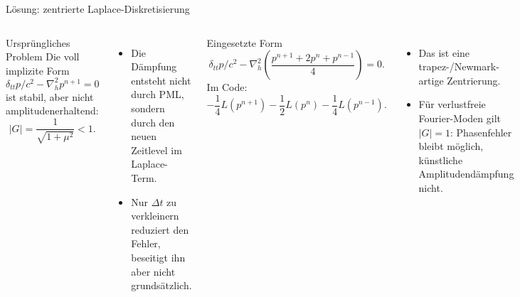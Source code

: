 \documentclass[
	german,%
	accentcolor=9c,%
	accept-missing-logos=true,%
]{tudabeamer}
\begin{document}
\begin{frame}{Lösung: zentrierte Laplace-Diskretisierung}
    \scriptsize
    \setlength{\abovedisplayskip}{0.04cm}
    \setlength{\belowdisplayskip}{0.04cm}
    \begin{columns}[T]
    \begin{block}{Ursprüngliches Problem}
        Die voll implizite Form
        \[
            \delta_{tt}p/c^2-\nabla_h^2p^{n+1}=0
        \]
        ist stabil, aber nicht amplitudenerhaltend:
        \[
            |G|=\frac{1}{\sqrt{1+\mu^2}}<1 .
        \]
    \end{block}
    \begin{itemize}
        \setlength{\itemsep}{0.04cm}
        \item Die Dämpfung entsteht nicht durch PML, sondern durch den
        neuen Zeitlevel im Laplace-Term.
        \item Nur $\Delta t$ zu verkleinern reduziert den Fehler, beseitigt ihn
        aber nicht grundsätzlich.
    \end{itemize}

    \begin{block}{Eingesetzte Form}
        \[
            \delta_{tt}p/c^2
            -\nabla_h^2\left(
                \frac{p^{n+1}+2p^n+p^{n-1}}{4}
            \right)=0 .
        \]
        Im Code:
        \[
            -\frac14 L(p^{n+1})
            -\frac12 L(p^n)
            -\frac14 L(p^{n-1}) .
        \]
    \end{block}
    \begin{itemize}
        \setlength{\itemsep}{0.04cm}
        \item Das ist eine trapez-/Newmark-artige Zentrierung.
        \item Für verlustfreie Fourier-Moden gilt $|G|=1$:
        Phasenfehler bleibt möglich, künstliche Amplitudendämpfung nicht.
    \end{itemize}
    \end{columns}
\end{frame}
\end{document}
